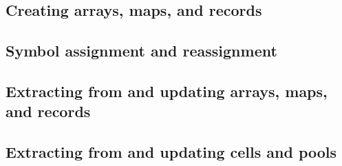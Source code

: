 \documentclass{article}
\theoremstyle{definition}
\begin{document}

\hypertarget{hsec:new-form}{}
\subsection{Creating arrays, maps, and records}
\label{sec:new-form}


\hypertarget{hsec:let-set}{}
\subsection{Symbol assignment and reassignment}
\label{sec:let-set}


\hypertarget{hsec:attr-form}{}
\subsection{Extracting from and updating arrays, maps, and records}
\label{sec:attr-form}



\hypertarget{hsec:cell-pool-forms}{}
\subsection{Extracting from and updating cells and pools}
\label{sec:cell-pool-forms}

\end{document}
